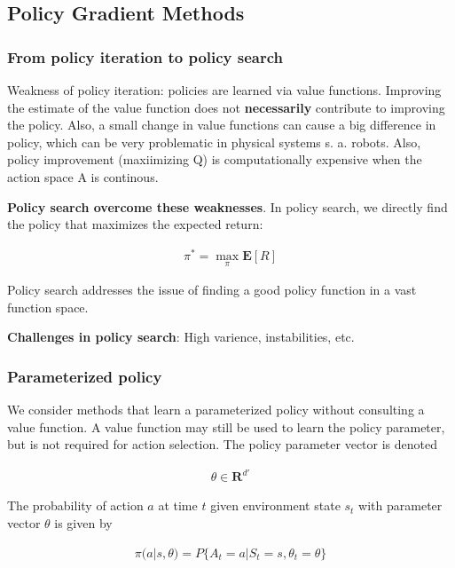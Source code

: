 \subsection{Policy Gradient Methods}

\subsubsection{From policy iteration to policy search}

Weakness of policy iteration: policies are learned via value functions. Improving the estimate of the value function does not \textbf{necessarily} contribute to improving the policy. Also, a small change in value functions can cause a big difference in policy, which can be very problematic in physical systems s. a. robots. Also, policy improvement (maxiimizing Q) is computationally expensive when the action space A is continous.

\textbf{Policy search overcome these weaknesses}. In policy search, we directly find the policy that maximizes the expected return:

\begin{align}
    \pi^* = \max_{\pi} \mathbf{E}[R]
\end{align}

Policy search addresses the issue of finding a good policy function in a vast function space. 

\textbf{Challenges in policy search}: High varience, instabilities, etc.

\subsubsection{Parameterized policy}

We consider methods that learn a parameterized policy without consulting a value function. A value function may still be used to learn the policy parameter, but is not required for action selection. The policy parameter vector is denoted 

\begin{align}
    \theta \in \mathbf{R}^{d'}
\end{align}

The probability of action $a$ at time $t$ given environment state $s_t$ with parameter vector $\theta$ is given by

\begin{align}
    \pi(a|s, \theta) = P\{A_t = a| S_t = s, \theta_t = \theta\}
\end{align}

